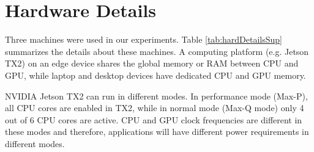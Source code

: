 \documentclass[runningheads]{llncs}
\begin{document}



\clearpage

\appendix

\section{Hardware Details}
\label{sec:hardwareDetailsSup}
Three machines were used in our experiments. Table \ref{tab:hardDetailsSup} summarizes the details about these machines. A computing platform (e.g. Jetson TX2) on an edge device shares the global memory or RAM between CPU and GPU, while laptop and desktop devices have dedicated CPU and GPU memory.

NVIDIA Jetson TX2 can run in different modes. In performance mode (Max-P), all CPU cores are enabled in TX2, while in normal mode (Max-Q mode) only 4 out of 6 CPU cores are active. CPU and GPU clock frequencies are different in these modes and therefore, applications will have different power requirements in different modes.
\end{document}
